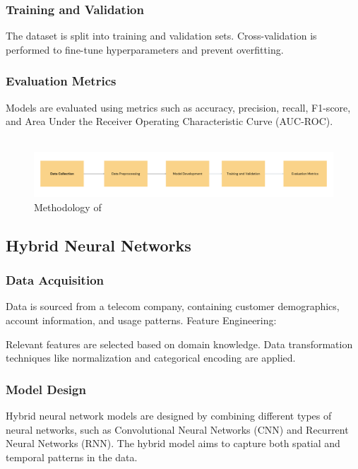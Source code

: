 \subsubsection{Training and Validation}

The dataset is split into training and validation sets.
Cross-validation is performed to fine-tune hyperparameters and prevent overfitting.
\subsubsection{Evaluation Metrics}

Models are evaluated using metrics such as accuracy, precision, recall, F1-score, and Area Under the Receiver Operating Characteristic Curve (AUC-ROC).\\\\

\begin{figure}[H]
    \centering
    \includegraphics[width=1\textwidth]{img/model 2.png}
    \caption{Methodology of \cite{TSAI200912547}}
    \label{fig:Methodology of paper 2}
\end{figure}

\subsection{Hybrid Neural Networks}

\subsubsection{Data Acquisition}

Data is sourced from a telecom company, containing customer demographics, account information, and usage patterns.
Feature Engineering:

Relevant features are selected based on domain knowledge.
Data transformation techniques like normalization and categorical encoding are applied.
\subsubsection{Model Design}

Hybrid neural network models are designed by combining different types of neural networks, such as Convolutional Neural Networks (CNN) and Recurrent Neural Networks (RNN).
The hybrid model aims to capture both spatial and temporal patterns in the data.

